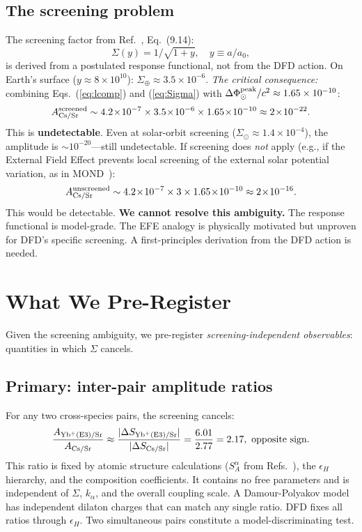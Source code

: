 \documentclass[aps,prd,twocolumn,superscriptaddress,floatfix]{revtex4-2}
\newcommand{\kalpha}{k_\alpha}
\newcommand{\epsH}{\epsilon_H}
\newcommand{\azero}{a_0}
\begin{document}
\subsection{The screening problem}\label{sec:screening}
The screening factor from Ref.~\cite{Alcock2026DFD}, Eq.~(9.14):
\begin{equation}\label{eq:Sigma}
\Sigma(y) = 1/\sqrt{1+y}, \quad y \equiv a/\azero,
\end{equation}
is derived from a postulated response functional, not from the
DFD action. On Earth's surface ($y \approx 8 \times 10^{10}$):
$\Sigma_\oplus \approx 3.5 \times 10^{-6}$.
\textit{The critical consequence:} combining Eqs.~(\ref{eq:lcomp})
and (\ref{eq:Sigma}) with $\Delta\Phi_\odot^{\rm peak}/c^2 \approx
1.65 \times 10^{-10}$:
\begin{equation}
A_{\rm Cs/Sr}^{\rm screened} \sim 4.2\!\times\!10^{-7}\times
3.5\!\times\!10^{-6}\times 1.65\!\times\!10^{-10}
\approx 2\!\times\!10^{-22}.
\end{equation}
This is \textbf{undetectable}. Even at solar-orbit screening
($\Sigma_\odot \approx 1.4 \times 10^{-4}$), the amplitude is
$\sim\!10^{-20}$---still undetectable.
If screening does \textit{not} apply (e.g., if the External Field
Effect prevents local screening of the external solar potential
variation, as in MOND~\cite{Milgrom1983}):
\begin{equation}
A_{\rm Cs/Sr}^{\rm unscreened} \sim 4.2\!\times\!10^{-7}\times
3\times 1.65\!\times\!10^{-10} \approx 2\!\times\!10^{-16}.
\end{equation}
This would be detectable.
\textbf{We cannot resolve this ambiguity.} The response functional
is model-grade. The EFE analogy is physically motivated but
unproven for DFD's specific screening. A first-principles
derivation from the DFD action is needed.
\section{What We Pre-Register}
Given the screening ambiguity, we pre-register
\textit{screening-independent observables}: quantities in which
$\Sigma$ cancels.
\subsection{Primary: inter-pair amplitude ratios}
For any two cross-species pairs, the screening cancels:
\begin{equation}
\frac{A_{\rm Yb^+(E3)/Sr}}{A_{\rm Cs/Sr}}
\approx \frac{|\Delta S_{\rm Yb^+(E3)/Sr}|}
{|\Delta S_{\rm Cs/Sr}|}
= \frac{6.01}{2.77} = 2.17,\ \text{opposite sign.}
\end{equation}
This ratio is fixed by atomic structure calculations
($S_A^\alpha$ from Refs.~\cite{Flambaum2009,Dzuba2018}), the
$\epsH$ hierarchy, and the composition coefficients. It contains
no free parameters and is independent of $\Sigma$, $\kalpha$,
and the overall coupling scale.
A Damour-Polyakov model~\cite{Damour1994} has independent dilaton
charges that can match any single ratio. DFD fixes all ratios
through $\epsH$. Two simultaneous pairs constitute a
model-discriminating test.
\end{document}

